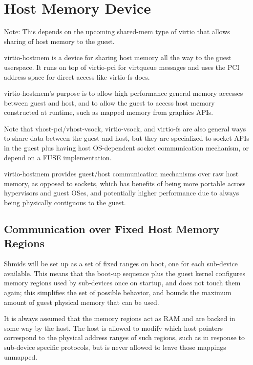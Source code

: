 \section{Host Memory Device}\label{sec:Device Types / Host Memory Device}

Note: This depends on the upcoming shared-mem type of virtio
that allows sharing of host memory to the guest.

virtio-hostmem is a device for sharing host memory all the way to the guest userspace.
It runs on top of virtio-pci for virtqueue messages and
uses the PCI address space for direct access like virtio-fs does.

virtio-hostmem's purpose is
to allow high performance general memory accesses between guest and host,
and to allow the guest to access host memory constructed at runtime,
such as mapped memory from graphics APIs.

Note that vhost-pci/vhost-vsock, virtio-vsock, and virtio-fs
are also general ways to share data between the guest and host,
but they are specialized to socket APIs in the guest plus
having host OS-dependent socket communication mechanism,
or depend on a FUSE implementation.

virtio-hostmem provides guest/host communication mechanisms over raw host memory,
as opposed to sockets,
which has benefits of being more portable across hypervisors and guest OSes,
and potentially higher performance due to always being physically contiguous to the guest.

\subsection{Communication over Fixed Host Memory Regions}\label{sec:Device Types / Host Memory Device / Communication over Fixed Host Memory Regions}

Shmids will be set up as a set of fixed ranges on boot,
one for each sub-device available.
This means that the boot-up sequence plus the guest kernel
configures memory regions used by sub-devices once on startup,
and does not touch them again;
this simplifies the set of possible behavior,
and bounds the maximum amount of guest physical memory that can be used.

It is always assumed that the memory regions act as RAM
and are backed in some way by the host.
The host is allowed to modify which host pointers
correspond to the physical address ranges of such regions,
such as in response to sub-device specific protocols,
but is never allowed to leave those mappings unmapped.

